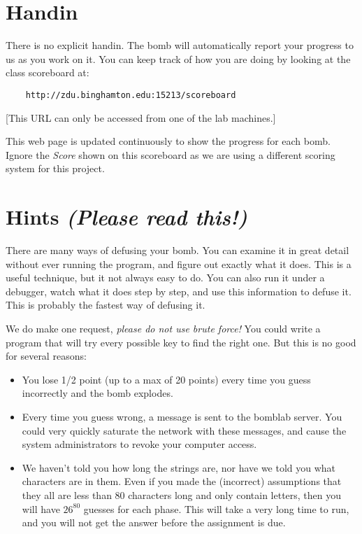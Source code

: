 \documentclass[11pt]{article}
\begin{document}
\section*{Handin}

There is no explicit handin. The bomb will automatically report your
progress to us as you work on it.  You can keep track of how you are
doing by looking at the class scoreboard at:

\begin{verbatim}
    http://zdu.binghamton.edu:15213/scoreboard
\end{verbatim}

[This URL can only be accessed from one of the lab machines.]

This web page is updated continuously to show the progress for
each bomb.  Ignore the {\em Score} shown on this scoreboard as
we are using a different scoring system for this project.


\section*{Hints {\em (Please read this!)}}

There are many ways of defusing your bomb.  You can examine it in
great detail without ever running the program, and figure out exactly
what it does.  This is a useful technique, but it not always easy to
do.  You can also run it under a debugger, watch what it does step
by step, and use this information to defuse it.  This is probably the
fastest way of defusing it.

We do make one request, {\em please do not use brute force!}  You could
write a program that will try every possible key to find the right
one.  But this is no good for several reasons:
\begin{itemize}
\item You lose 1/2 point (up to a max of 20 points) 
every time you guess incorrectly and the bomb explodes.  

\item Every time you guess wrong, a message is sent to the bomblab server.  
You could very quickly saturate the network with these messages, and cause
the system administrators to revoke your computer access.

\item We haven't told you how long the strings are, nor have we told you
what characters are in them.  Even if you made the (incorrect) assumptions
that they all are less than 80 characters long and only contain
letters, then you will have $26^{80}$ guesses for each phase.  This will
take a very long time to run, and you will not get the answer before
the assignment is due.
\end{itemize}
\end{document}
